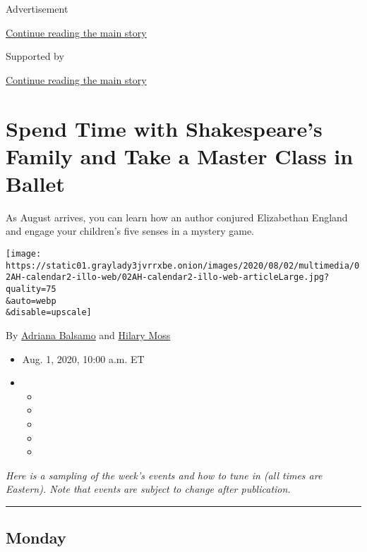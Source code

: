 Advertisement

\protect\hyperlink{after-top}{Continue reading the main story}

Supported by

\protect\hyperlink{after-sponsor}{Continue reading the main story}

\hypertarget{spend-time-with-shakespeares-family-and-take-a-master-class-in-ballet}{%
\section{Spend Time with Shakespeare's Family and Take a Master Class in
Ballet}\label{spend-time-with-shakespeares-family-and-take-a-master-class-in-ballet}}

As August arrives, you can learn how an author conjured Elizabethan
England and engage your children's five senses in a mystery game.

\texttt{[image: https://static01.graylady3jvrrxbe.onion/images/2020/08/02/multimedia/02AH-calendar2-illo-web/02AH-calendar2-illo-web-articleLarge.jpg?quality=75\\\&auto=webp\\\&disable=upscale]}

By \href{https://www.nytimes3xbfgragh.onion/by/adriana-balsamo}{Adriana
Balsamo} and
\href{https://www.nytimes3xbfgragh.onion/by/hilary-moss}{Hilary Moss}

\begin{itemize}
\item
  Aug. 1, 2020, 10:00 a.m. ET
\item
  \begin{itemize}
  \item
  \item
  \item
  \item
  \item
  \end{itemize}
\end{itemize}

\emph{Here is a sampling of the week's events and how to tune in (all
times are Eastern). Note that events are subject to change after
publication.}

\begin{center}\rule{0.5\linewidth}{\linethickness}\end{center}

\hypertarget{monday}{%
\subsection{Monday}\label{monday}}

